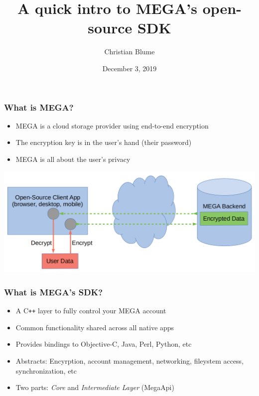 \documentclass[11pt]{beamer}
\begin{document}
\title{A quick intro to MEGA's open-source SDK}
\author{Christian Blume}
\date{December 3, 2019} 

\begin{frame}
\titlepage
\end{frame}

\begin{frame}[fragile]
\frametitle{What is MEGA?}
\bigskip
\bigskip

\begin{itemize}
\item MEGA is a cloud storage provider using end-to-end encryption
\item The encryption key is in the user's hand (their password)
\item MEGA is all about the user's privacy
\end{itemize}
\bigskip

\begin{center}
\includegraphics[width=1\textwidth]{img/general}
\end{center}

\end{frame}

\begin{frame}[fragile]
\frametitle{What is MEGA's SDK?}
\bigskip

\begin{itemize}
\setlength\itemsep{1em}
\item A C\texttt{++} layer to fully control your MEGA account
\item Common functionality shared across all native apps
\item Provides bindings to Objective-C, Java, Perl, Python, etc
\item Abstracts: Encyrption, account management, networking, fileystem
  access, synchronization, etc
\item Two parts: \textit{Core} and \textit{Intermediate Layer} (MegaApi)
\end{itemize}
\end{frame}
\end{document}
